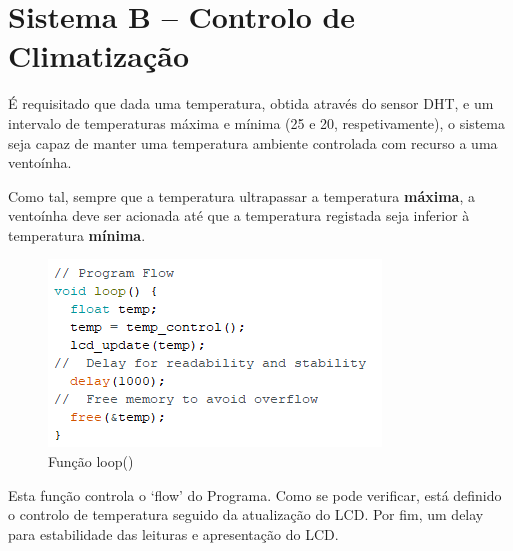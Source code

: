 \section{Sistema B – Controlo de Climatização}

É requisitado que dada uma temperatura, obtida através do sensor DHT, e um intervalo de temperaturas máxima e mínima (25 e 20, respetivamente), o sistema seja capaz de manter uma temperatura ambiente controlada com recurso a uma ventoínha.

Como tal, sempre que a temperatura ultrapassar a temperatura \textbf{máxima}, a ventoínha deve ser acionada até que a temperatura registada seja inferior à temperatura \textbf{mínima}.

\begin{figure}[H]
    \centering
    \includegraphics{images/codigo/sisB_loop.png}
    \caption{Função loop()}
\end{figure}

Esta função controla o `flow' do Programa. Como se pode verificar, está definido o controlo de temperatura seguido da atualização do LCD. Por fim, um delay para estabilidade das leituras e apresentação do LCD.

